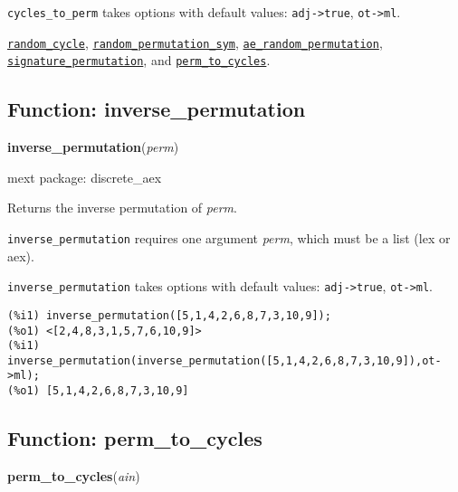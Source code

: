 \documentclass[]{article}
\begin{document}
\vspace{5 pt}

{\tt cycles\_to\_perm} takes options with default values: {\tt adj->true}, {\tt ot->ml}.
\vspace{5 pt}


  \hyperlink{random_cycle}{{\tt random\_cycle}}, \hyperlink{random_permutation_sym}{{\tt random\_permutation\_sym}}, \hyperlink{ae_random_permutation}{{\tt ae\_random\_permutation}}, \hyperlink{signature_permutation}{{\tt signature\_permutation}}, and \hyperlink{perm_to_cycles}{{\tt perm\_to\_cycles}}.

\vspace{5 pt}


\subsection{Function: inverse\_permutation\label{sec:inverse_permutation}}
\hypertarget{inverse_permutation}{}
{\bf inverse\_permutation}({\it perm})


\noindent mext package: discrete\_aex



\vspace{5 pt}
Returns the inverse permutation of {\it perm}. 

\vspace{5 pt}

   {\tt inverse\_permutation} requires one argument {\it perm}, which must be a list (lex or aex).


\vspace{5 pt}

{\tt inverse\_permutation} takes options with default values: {\tt adj->true}, {\tt ot->ml}.
\vspace{5 pt}


\begin{Verbatim}[frame=single]
(%i1) inverse_permutation([5,1,4,2,6,8,7,3,10,9]);
(%o1) <[2,4,8,3,1,5,7,6,10,9]>
(%i1) inverse_permutation(inverse_permutation([5,1,4,2,6,8,7,3,10,9]),ot->ml);
(%o1) [5,1,4,2,6,8,7,3,10,9]
\end{Verbatim}


\subsection{Function: perm\_to\_cycles\label{sec:perm_to_cycles}}
\hypertarget{perm_to_cycles}{}
{\bf perm\_to\_cycles}({\it ain})
\end{document}
